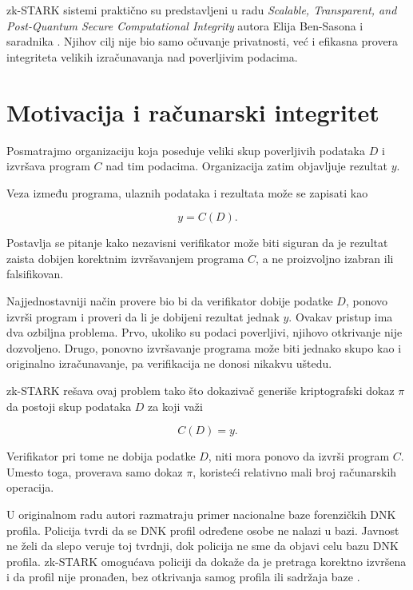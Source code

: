 zk-STARK sistemi praktično su predstavljeni u radu
\textit{Scalable, Transparent, and Post-Quantum Secure Computational Integrity}
autora Elija Ben-Sasona i saradnika \cite{stark2018}. Njihov cilj nije bio samo
očuvanje privatnosti, već i efikasna provera integriteta velikih izračunavanja
nad poverljivim podacima.

\section{Motivacija i računarski integritet}

Posmatrajmo organizaciju koja poseduje veliki skup poverljivih podataka
\(D\) i izvršava program \(C\) nad tim podacima. Organizacija zatim objavljuje
rezultat \(y\).

Veza između programa, ulaznih podataka i rezultata može se zapisati kao

\begin{equation}
    y = C(D).
\end{equation}

Postavlja se pitanje kako nezavisni verifikator može biti siguran da je rezultat
zaista dobijen korektnim izvršavanjem programa \(C\), a ne proizvoljno izabran
ili falsifikovan.

Najjednostavniji način provere bio bi da verifikator dobije podatke \(D\), ponovo
izvrši program i proveri da li je dobijeni rezultat jednak \(y\). Ovakav pristup
ima dva ozbiljna problema. Prvo, ukoliko su podaci poverljivi, njihovo otkrivanje
nije dozvoljeno. Drugo, ponovno izvršavanje programa može biti jednako skupo
kao i originalno izračunavanje, pa verifikacija ne donosi nikakvu uštedu.

zk-STARK rešava ovaj problem tako što dokazivač generiše kriptografski dokaz
\(\pi\) da postoji skup podataka \(D\) za koji važi

\begin{equation}
    C(D) = y.
\end{equation}

Verifikator pri tome ne dobija podatke \(D\), niti mora ponovo da izvrši program
\(C\). Umesto toga, proverava samo dokaz \(\pi\), koristeći relativno mali broj
računarskih operacija.

U originalnom radu autori razmatraju primer nacionalne baze forenzičkih DNK
profila. Policija tvrdi da se DNK profil određene osobe ne nalazi u bazi.
Javnost ne želi da slepo veruje toj tvrdnji, dok policija ne sme da objavi celu
bazu DNK profila. zk-STARK omogućava policiji da dokaže da je pretraga korektno
izvršena i da profil nije pronađen, bez otkrivanja samog profila ili sadržaja baze
\cite{stark2018}.

